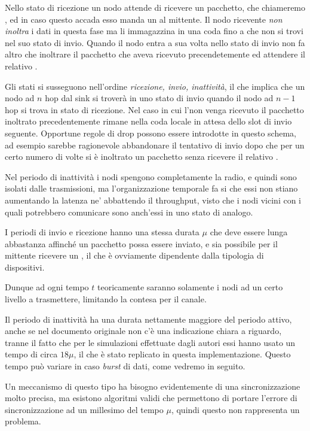 \documentclass[twoside,11pt,a4paper,italian,openany]{book}
\begin{document}
Nello stato di ricezione un nodo attende di ricevere un pacchetto, che chiameremo \req,
ed in caso questo accada esso manda un \ack al mittente. 
Il nodo ricevente \emph{non inoltra} i dati in questa 
fase ma li immagazzina in una coda fino a che non si trovi nel suo stato di invio. 
Quando il nodo entra a sua volta nello stato di invio non fa altro che inoltrare il pacchetto 
che aveva ricevuto precendetemente ed attendere il relativo \ack.  

Gli stati si susseguono nell'ordine \emph{ricezione, invio, inattività}, il che implica
che un nodo ad $n$ hop dal sink si troverà in uno stato di invio quando il nodo ad $n-1$ 
hop si trova in stato di ricezione. 
Nel caso in cui l'\ack  non venga ricevuto il pacchetto 
inoltrato precedentemente rimane nella coda locale in attesa dello slot di invio seguente. 
Opportune regole di drop possono essere introdotte in questo schema, ad esempio sarebbe 
ragionevole abbandonare il tentativo di invio dopo che per un certo numero di volte si è 
inoltrato un pacchetto senza ricevere il relativo \ack. 
 
Nel periodo di inattività i nodi spengono completamente la radio, e quindi sono isolati dalle 
trasmissioni, ma l'organizzazione temporale fa si che essi non stiano aumentando la latenza ne' 
abbattendo il throughput, visto che i nodi vicini con i quali potrebbero comunicare sono 
anch'essi in uno stato di analogo. 

I periodi di invio e ricezione hanno una stessa durata $\mu$ che deve essere lunga abbastanza 
affinché un pacchetto possa essere inviato, e  sia possibile per il mittente ricevere un  
 \ack, il che è ovviamente dipendente dalla tipologia di dispositivi. 
 
Dunque ad ogni tempo $t$ teoricamente saranno solamente i nodi ad un certo livello a 
trasmettere, limitando la contesa per il canale. 

Il periodo di inattività ha una durata nettamente maggiore del periodo attivo, anche se nel 
documento originale non c'è una indicazione chiara a riguardo, tranne il fatto che per le 
simulazioni effettuate dagli autori essi hanno usato un tempo di circa $18\mu$, il che è stato replicato in questa implementazione. 
Questo tempo può variare in caso \emph{burst} di dati, come vedremo in seguito.

Un meccanismo di questo tipo ha bisogno evidentemente di una sincronizzazione molto precisa, ma 
esistono algoritmi validi\cite{sync} che permettono di portare l'errore di sincronizzazione 
ad un millesimo del tempo $\mu$, quindi questo non rappresenta un problema. 
\end{document}
